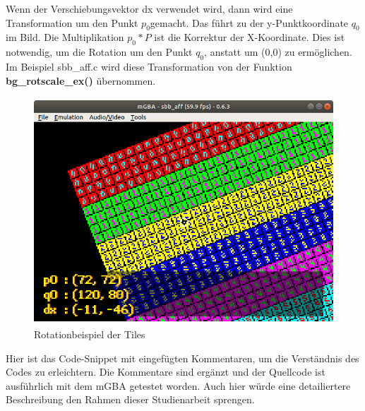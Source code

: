 Wenn der Verschiebungsvektor dx verwendet wird, dann wird eine Transformation um den Punkt $p_{0}$gemacht. Das führt zu der y-Punktkoordinate $q_{0}$im Bild. Die Multiplikation $p_{0}* P$ ist die Korrektur der X-Koordinate. Dies ist notwendig, um die Rotation um den Punkt $q_{0}$, anstatt um (0,0) zu ermöglichen. Im Beispiel sbb\_aff.c wird diese Transformation von der Funktion \textbf{bg\_rotscale\_ex()} übernommen.
\begin{figure}[h]
	\centering
	\includegraphics[height=85mm]{img/rotation.png}
	\caption{Rotationbeispiel der Tiles}
\end{figure}

Hier ist das Code-Snippet mit eingefügten Kommentaren, um die Verständnis des Codes zu erleichtern. Die Kommentare sind ergänzt und der Quellcode ist ausführlich mit dem mGBA getestet worden. Auch hier würde eine detailiertere Beschreibung den Rahmen dieser Studienarbeit sprengen.

